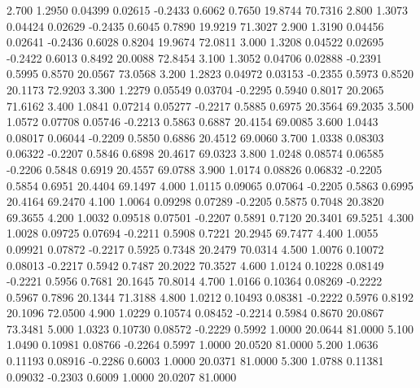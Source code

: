    2.700   1.2950   0.04399   0.02615  -0.2433   0.6062   0.7650  19.8744  70.7316
   2.800   1.3073   0.04424   0.02629  -0.2435   0.6045   0.7890  19.9219  71.3027
   2.900   1.3190   0.04456   0.02641  -0.2436   0.6028   0.8204  19.9674  72.0811
   3.000   1.3208   0.04522   0.02695  -0.2422   0.6013   0.8492  20.0088  72.8454
   3.100   1.3052   0.04706   0.02888  -0.2391   0.5995   0.8570  20.0567  73.0568
   3.200   1.2823   0.04972   0.03153  -0.2355   0.5973   0.8520  20.1173  72.9203
   3.300   1.2279   0.05549   0.03704  -0.2295   0.5940   0.8017  20.2065  71.6162
   3.400   1.0841   0.07214   0.05277  -0.2217   0.5885   0.6975  20.3564  69.2035
   3.500   1.0572   0.07708   0.05746  -0.2213   0.5863   0.6887  20.4154  69.0085
   3.600   1.0443   0.08017   0.06044  -0.2209   0.5850   0.6886  20.4512  69.0060
   3.700   1.0338   0.08303   0.06322  -0.2207   0.5846   0.6898  20.4617  69.0323
   3.800   1.0248   0.08574   0.06585  -0.2206   0.5848   0.6919  20.4557  69.0788
   3.900   1.0174   0.08826   0.06832  -0.2205   0.5854   0.6951  20.4404  69.1497
   4.000   1.0115   0.09065   0.07064  -0.2205   0.5863   0.6995  20.4164  69.2470
   4.100   1.0064   0.09298   0.07289  -0.2205   0.5875   0.7048  20.3820  69.3655
   4.200   1.0032   0.09518   0.07501  -0.2207   0.5891   0.7120  20.3401  69.5251
   4.300   1.0028   0.09725   0.07694  -0.2211   0.5908   0.7221  20.2945  69.7477
   4.400   1.0055   0.09921   0.07872  -0.2217   0.5925   0.7348  20.2479  70.0314
   4.500   1.0076   0.10072   0.08013  -0.2217   0.5942   0.7487  20.2022  70.3527
   4.600   1.0124   0.10228   0.08149  -0.2221   0.5956   0.7681  20.1645  70.8014
   4.700   1.0166   0.10364   0.08269  -0.2222   0.5967   0.7896  20.1344  71.3188
   4.800   1.0212   0.10493   0.08381  -0.2222   0.5976   0.8192  20.1096  72.0500
   4.900   1.0229   0.10574   0.08452  -0.2214   0.5984   0.8670  20.0867  73.3481
   5.000   1.0323   0.10730   0.08572  -0.2229   0.5992   1.0000  20.0644  81.0000
   5.100   1.0490   0.10981   0.08766  -0.2264   0.5997   1.0000  20.0520  81.0000
   5.200   1.0636   0.11193   0.08916  -0.2286   0.6003   1.0000  20.0371  81.0000
   5.300   1.0788   0.11381   0.09032  -0.2303   0.6009   1.0000  20.0207  81.0000
